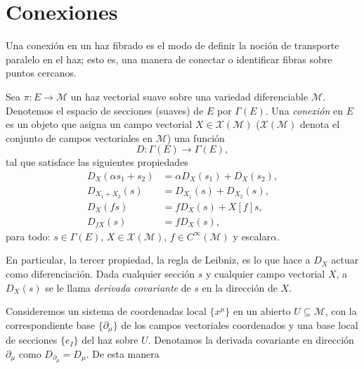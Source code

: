 \section{Conexiones}

Una conexi\'{o}n en un haz fibrado es el modo de definir la noci\'{o}n de transporte paralelo en el haz; esto es, una manera de conectar o identificar fibras sobre puntos cercanos.

Sea $\pi:E \rightarrow \mathcal{M}$ un haz vectorial suave sobre una variedad diferenciable $\mathcal{M}$. Denotemos el espacio de secciones (suaves) de $E$ por $\Gamma (E)$. Una \emph{conexi\'{o}n} en $E$ es un objeto que asigna un campo vectorial $X \in \mathcal{X(M)}$ ($\mathcal{X(M)}$ denota el conjunto de campos vectoriales en $\mathcal{M}$) una funci\'{o}n
%
\begin{equation}
D: \Gamma (E) \rightarrow \Gamma(E),
\end{equation}
%
tal que satisface las siguientes propiedades
%
\begin{align*}
D_{X} (\alpha s_{1} + s_{2}) & = \alpha D_{X} (s_{1}) + D_{X} (s_{2}), \\
D_{X_{1} + X_{2}} (s) & = D_{X_{1}} (s) + D_{X_{2}} (s), \\
D_{X} (fs) & = f D_{X} (s) + X[f] s, \\
D_{fX} (s) & = f D_{X} (s),
\end{align*}
para todo: $s \in \Gamma(E)$, $X \in \mathcal{X(M)}$, $f \in C^{\infty}(\mathcal{M})$ y escalar\footnotemark $\alpha$.

En particular, la tercer propiedad, la regla de Leibniz, es lo que hace a $D_{X}$ actuar como diferenciaci\'{o}n. Dada cualquier secci\'{o}n $s$ y cualquier campo vectorial $X$, a $D_{X} (s)$ se le llama \emph{derivada covariante} de $s$ en la direcci\'{o}n de $X$.

Consideremos un sistema de coordenadas local $\{x^{\mu}\}$ en un abierto $U \subseteq \mathcal{M}$, con la correspondiente base $\{\partial_{\mu}\}$ de los campos vectoriales coordenados y una base local de secciones $\{e_{I}\}$ del haz sobre $U$. Denotamos la derivada covariante en direcci\'{o}n $\partial_{\mu}$ como $D_{\partial_{\mu}} = D_{\mu}$. De esta manera

